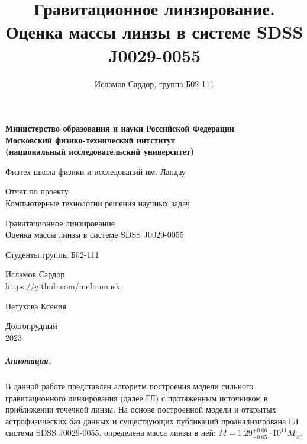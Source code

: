\documentclass[12pt,a4paper]{article}
\title{Гравитационное линзирование.\\
Оценка массы линзы в системе SDSS J0029-0055}
\author{Исламов Сардор, группа Б02-111}
\begin{document}
\begin{titlepage}
    \centering
        {\bfseries 
        Министерство образования и науки Российской Федерации \\
        Московский физико-технический интститут \\
        (национальный исследовательский университет)}
        \vspace{3em}

        Физтех-школа физики и исследований им. Ландау
        \vspace{3em}         
    
        Отчет по проекту\\
        Компьютерные технологии решения научных задач
        \vspace{7em}
    
        \Large Гравитационное линзирование\\
        Оценка массы линзы в системе SDSS J0029-0055
    
        \vspace{5em}
    
        
        \small
        \begin{flushright}
            Студенты группы Б02-111\\
            \vspace{1em}

            Исламов Сардор\\
            \url{https://github.com/meIonmusk} \\
            \vspace{1em}

            Петухова Ксения
        \end{flushright}

        \vspace{20em}
        Долгопрудный\\ 2023
\end{titlepage}

\subparagraph*{Аннотация.} В данной работе представлен алгоритм построения модели сильного гравитационного линзирования (далее ГЛ) с протяженным источником в приближении точечной линзы. 
На основе построенной модели и открытых астрофизических баз данных и существующих публикаций проанализирована ГЛ система SDSS J0029-0055, определена масса линзы в ней: $M = 1.29^{+0.06}_{-0.05} \cdot 10^{11} M_\odot$.
\end{document}
